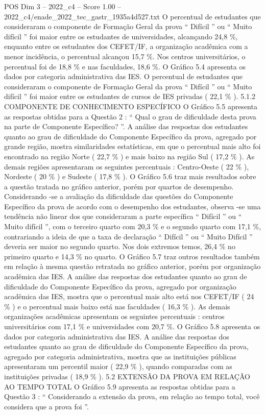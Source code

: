 \begin{textsample}{POS Dim 3 – 2022\_c4 – Score 1.00 – 2022\_c4/enade\_2022\_tec\_gastr\_1935a4d527.txt}
O percentual de estudantes que consideraram o componente de Formação Geral da prova “ Difícil ” ou “ Muito difícil ” foi maior entre os estudantes de universidades, alcançando 24,8 \%, enquanto entre os estudantes dos CEFET/IF, a organização acadêmica com a menor incidência, o percentual alcançou 15,7 \%.
Nos centros universitários, o percentual foi de 18,8 \% e nas faculdades, 18,6 \%.
O Gráfico 5.4 apresenta os dados por categoria administrativa das IES.
O percentual de estudantes que consideraram o componente de Formação Geral da prova “ Difícil ” ou “ Muito difícil ” foi maior entre os estudantes de cursos de IES privadas ( 22,1 \% ). 5.1.2 COMPONENTE DE CONHECIMENTO ESPECÍFICO O Gráfico 5.5 apresenta as respostas obtidas para a Questão 2 : “ Qual o grau de dificuldade desta prova na parte de Componente Específico? ”.
A análise das respostas dos estudantes quanto ao grau de dificuldade do Componente Específico da prova, agregado por grande região, mostra similaridades estatísticas, em que o percentual mais alto foi encontrado na região Norte ( 22,7 \% ) e mais baixo na região Sul ( 17,2 \% ).
As demais regiões apresentaram os seguintes percentuais : Centro-Oeste ( 22 \% ), Nordeste ( 20 \% ) e Sudeste ( 17,8 \% ).
O Gráfico 5.6 traz mais resultados sobre a questão tratada no gráfico anterior, porém por quartos de desempenho.
Considerando -se a avaliação da dificuldade das questões do Componente Específico da prova de acordo com o desempenho dos estudantes, observa -se uma tendência não linear dos que consideraram a parte específica “ Difícil ” ou “ Muito difícil ”, com o terceiro quarto com 20,3 \% e o segundo quarto com 17,1 \%, contrariando a ideia de que a taxa de declaração “ Difícil ” ou “ Muito Difícil ” deveria ser maior no segundo quarto.
Nos dois extremos temos, 26,4 \% no primeiro quarto e 14,3 \% no quarto.
O Gráfico 5.7 traz outros resultados também em relação à mesma questão retratada no gráfico anterior, porém por organização acadêmica das IES.
A análise das respostas dos estudantes quanto ao grau de dificuldade do Componente Específico da prova, agregado por organização acadêmica das IES, mostra que o percentual mais alto está nos CEFET/IF ( 24 \% ) e o percentual mais baixo está nas faculdades ( 16,3 \% ).
As demais organizações acadêmicas apresentam os seguintes percentuais : centros universitários com 17,1 \% e universidades com 20,7 \%.
O Gráfico 5.8 apresenta os dados por categoria administrativa das IES.
A análise das respostas dos estudantes quanto ao grau de dificuldade do Componente Específico da prova, agregado por categoria administrativa, mostra que as instituições públicas apresentaram um percentil maior ( 22,9 \% ), quando comparadas com as instituições privadas ( 18,9 \% ). 5.2 EXTENSÃO DA PROVA EM RELAÇÃO AO TEMPO TOTAL O Gráfico 5.9 apresenta as respostas obtidas para a Questão 3 : “ Considerando a extensão da prova, em relação ao tempo total, você considera que a prova foi ”.

\end{textsample}
